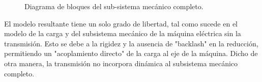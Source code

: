 \documentclass[a4paper, 10pt, journal]{ieeeconf}
\begin{document}
\begin{figure}[thpb]
    \centering
    \begin{adjustbox}{max width=\columnwidth}
    \end{adjustbox}
    \caption{Diagrama de bloques del sub-sistema mecánico completo.}
    \label{diagrama de bloques sub-sistema mecánico completo}
\end{figure}

El modelo resultante tiene un solo grado de libertad, tal como sucede en el modelo de la carga y del subsistema mecánico de la máquina eléctrica sin la transmisión. Esto se debe a la rigidez y la ausencia de "backlash" en la reducción, permitiendo un "acoplamiento directo" de la carga al eje de la máquina. Dicho de otra manera, la transmisión no incorpora dinámica al subsistema mecánico completo.
\end{document}
